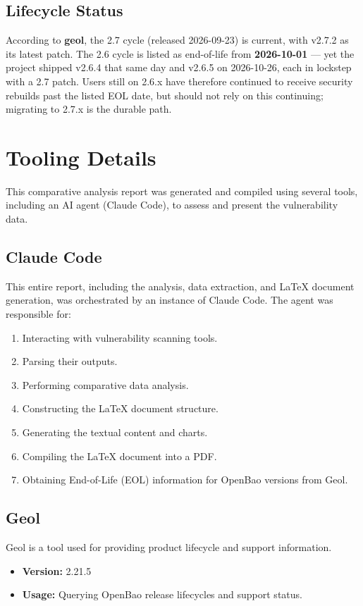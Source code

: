 \documentclass{article}
\begin{document}
\subsection{Lifecycle Status}
According to \textbf{geol}, the 2.7 cycle (released 2026-09-23) is current, with v2.7.2 as its latest patch. The 2.6 cycle is listed as end-of-life from \textbf{2026-10-01} --- yet the project shipped v2.6.4 that same day and v2.6.5 on 2026-10-26, each in lockstep with a 2.7 patch. Users still on 2.6.x have therefore continued to receive security rebuilds past the listed EOL date, but should not rely on this continuing; migrating to 2.7.x is the durable path.

\section{Tooling Details}
This comparative analysis report was generated and compiled using several tools, including an AI agent (Claude Code), to assess and present the vulnerability data.

\subsection{Claude Code}
This entire report, including the analysis, data extraction, and LaTeX document generation, was orchestrated by an instance of Claude Code. The agent was responsible for:
\begin{enumerate}
    \item Interacting with vulnerability scanning tools.
    \item Parsing their outputs.
    \item Performing comparative data analysis.
    \item Constructing the LaTeX document structure.
    \item Generating the textual content and charts.
    \item Compiling the \LaTeX{} document into a PDF.
    \item Obtaining End-of-Life (EOL) information for OpenBao versions from Geol.
\end{enumerate}

\subsection{Geol}
Geol is a tool used for providing product lifecycle and support information.
\begin{itemize}
    \item \textbf{Version:} 2.21.5
    \item \textbf{Usage:} Querying OpenBao release lifecycles and support status.
\end{itemize}
\end{document}

